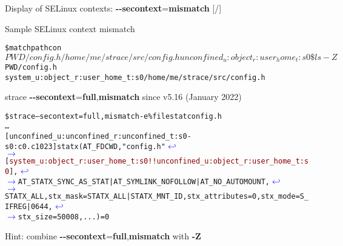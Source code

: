 \documentclass[unicode,aspectratio=169,xcolor={table,dvipsnames,usernames}]{beamer}
\newcommand{\symlinebreak}{\textcolor{blue}{\(\hookleftarrow\)}}
\newcommand{\symlinecont}{\textcolor{blue}{\(\longrightarrow\)}}
\begin{document}
\begin{frame}[fragile]{Display of SELinux contexts: \textbf{-{}-secontext}=\textbf{mismatch} \hfill [\insertframenumber/\inserttotalframenumber]}
\large
\begin{block}{Sample SELinux context mismatch}
\scriptsize
\begin{alltt}
\$ matchpathcon $PWD/config.h
/home/me/strace/src/config.h	unconfined_u:object_r:user_home_t:s0
\$ ls -Z $PWD/config.h
system_u:object_r:user_home_t:s0 /home/me/strace/src/config.h
\end{alltt}
\end{block}

\begin{block}{strace \textbf{-{}-secontext}=\textbf{full},\textbf{mismatch} \hfill since v5.16 (January 2022)}
\scriptsize
\begin{alltt}
\$ strace --secontext=full,mismatch -e \%file stat config.h
\ldots
[unconfined_u:unconfined_r:unconfined_t:s0-s0:c0.c1023] statx(AT_FDCWD, "config.h" \symlinebreak
\symlinecont [\textcolor{darkred}{system_u:object_r:user_home_t:s0!!unconfined_u:object_r:user_home_t:s0}], \symlinebreak
\symlinecont AT_STATX_SYNC_AS_STAT|AT_SYMLINK_NOFOLLOW|AT_NO_AUTOMOUNT, \symlinebreak
\symlinecont STATX_ALL, {stx_mask=STATX_ALL|STATX_MNT_ID, stx_attributes=0, stx_mode=S_IFREG|0644, \symlinebreak
\symlinecont stx_size=50008, ...}) = 0
\end{alltt}
\end{block}

Hint: combine \textbf{-{}-secontext}=\textbf{full},\textbf{mismatch} with \textbf{-Z}
\end{frame}
\end{document}

